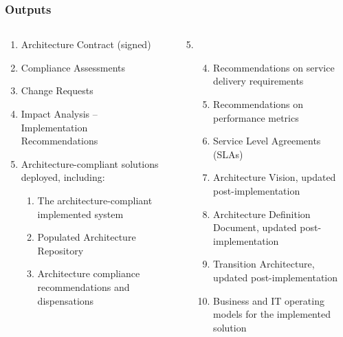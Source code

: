 \documentclass[aspectratio=169, table]{beamer}
\begin{document}
	\begin{frame}
		\frametitle{Outputs}
		\vspace{22pt}
		\begin{columns}[onlytextwidth]
			\begin{column}{0.5\textwidth}
				\begin{enumerate}
					\item Architecture Contract (signed)
					\item Compliance Assessments
					\item Change Requests
					\item Impact Analysis – Implementation Recommendations
					\item Architecture-compliant solutions deployed, including:
					\begin{enumerate}
						\item The architecture-compliant implemented system
						\item Populated Architecture Repository
						\item Architecture compliance recommendations and dispensations
					\end{enumerate}
				\end{enumerate}
				
			\end{column}
			\begin{column}{0.5\textwidth}
				\begin{enumerate}
					\setcounter{enumi}{4}
					\item[]
					\begin{enumerate}
						\setcounter{enumii}{3}
						\item Recommendations on service delivery requirements
						\item Recommendations on performance metrics
						\item Service Level Agreements (SLAs)
						\item Architecture Vision, updated post-implementation
						\item Architecture Definition Document, updated post-implementation
						\item Transition Architecture, updated post-implementation
						\item Business and IT operating models for the implemented solution
					\end{enumerate}
				\end{enumerate}
			\end{column}
		\end{columns}
	\end{frame}
	
\end{document}
